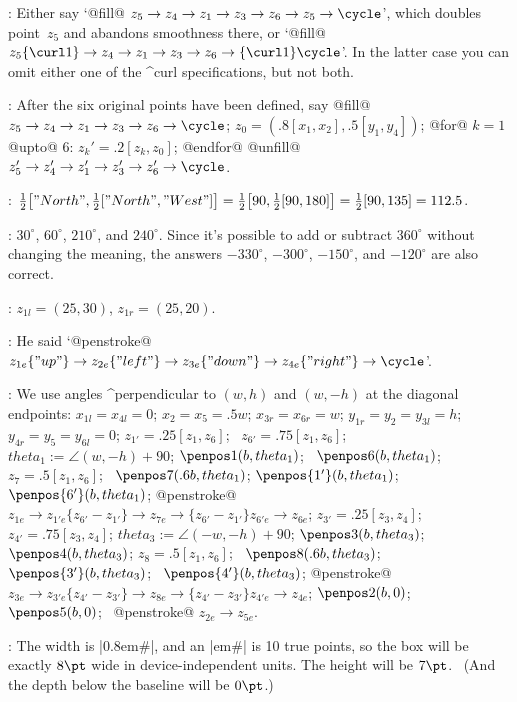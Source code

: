 :
 Either say `@fill@ $z_5\to z_4\to z_1\to z_3\to z_6\to z_5\to
\cycle$', which doubles point~$z_5$ and abandons smoothness there,
or `@fill@ $z_5\{\curl1\}\to z_4\to z_1\to z_3\to z_6\to
\{\curl1\}\cycle$'. In the latter case you can omit either one of
the ^{curl} specifications, but not both.

:
 After the six original points have been defined, say
\begindisplay
@fill@ $z_5\to z_4\to z_1\to z_3\to z_6\to\cycle$;\cr
$z_0=(.8[x_1,x_2],.5[y_1,y_4])$;\cr
@for@ $k=1$ @upto@ 6: $z_k'=.2[z_k,z_0]$; @endfor@\cr
@unfill@ $z_5'\to z_4'\to z_1'\to z_3'\to z_6'\to\cycle$.\cr
\enddisplay

:
 ${1\over2}\bigl["North",{1\over2}["North","West"]\bigr]=
{1\over2}\bigl[90,{1\over2}[90,180]\bigr]={1\over2}[90,135]=112.5$.

:
 $30^\circ$, $60^\circ$, $210^\circ$, and $240^\circ$. Since it's
possible to add or subtract $360^\circ$ without changing the meaning,
the answers $-330^\circ$, $-300^\circ$, $-150^\circ$, and $-120^\circ$
are also correct.

:
 $z_{1l}=(25,30)$, $z_{1r}=(25,20)$.

:
 He said `@penstroke@
$z_{1e}\{"up"\}\to z_{2e}\{"left"\}\to z_{3e}\{"down"\}
 \to z_{4e}\{"right"\}\to\cycle$'.

:
 We use angles ^{perpendicular} to $(w,h)$ and $(w,-h)$ at the
diagonal endpoints:
\begindisplay
$x_{1l}=x_{4l}=0$;\cr
$x_2=x_5=.5w$;\cr
$x_{3r}=x_{6r}=w$;\cr
$y_{1r}=y_2=y_{3l}=h$;\cr
$y_{4r}=y_5=y_{6l}=0$;\cr
$z_{1'}=.25[z_1,z_6]$; \ $z_{6'}=.75[z_1,z_6]$;\cr
$theta_1:=\angle(w,-h)+90$;\cr
$\penpos1(b,theta_1)$; \ $\penpos6(b,theta_1)$;\cr
$z_7=.5[z_1,z_6]$; \ $\penpos7(.6b,theta_1)$;\cr
$\penpos{1'}(b,theta_1)$; \ $\penpos{6'}(b,theta_1)$;\cr
@penstroke@ $z_{1e}\to z_{1'e}\{z_{6'}-z_{1'}\}\to z_{7e}\to
\{z_{6'}-z_{1'}\}z_{6'e}\to z_{6e}$;\cr
$z_{3'}=.25[z_3,z_4]$; \ $z_{4'}=.75[z_3,z_4]$;\cr
$theta_3:=\angle(-w,-h)+90$;\cr
$\penpos3(b,theta_3)$; \ $\penpos4(b,theta_3)$;\cr
$z_8=.5[z_1,z_6]$; \ $\penpos8(.6b,theta_3)$;\cr
$\penpos{3'}(b,theta_3)$; \ $\penpos{4'}(b,theta_3)$;\cr
@penstroke@ $z_{3e}\to z_{3'e}\{z_{4'}-z_{3'}\}\to z_{8e}\to
\{z_{4'}-z_{3'}\}z_{4'e}\to z_{4e}$;\cr
$\penpos2(b,0)$; \ $\penpos5(b,0)$; \ @penstroke@ $z_{2e}\to z_{5e}$.\cr
\enddisplay

:
 The width is |0.8em#|, and an |em#| is 10 true points, so the
box will be exactly $8\pt$ wide in device-independent units. The
height will be $7\pt$. \ (And the depth below the baseline will be $0\pt$.)

